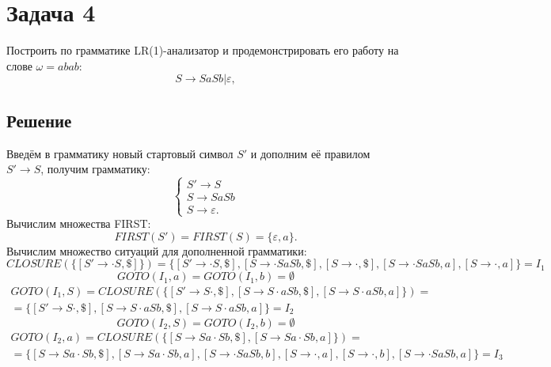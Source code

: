 \documentclass[11pt]{article}
\begin{document}
\section{Задача 4}
\label{sec:org5ca31a9}
Построить по грамматике LR(1)-анализатор и продемонстрировать его работу на слове \(\omega = abab\):
\begin{equation}
S \rightarrow SaSb | \varepsilon,
\end{equation}
\subsection{Решение}
\label{sec:org4dc1cd1}
Введём в грамматику новый стартовый символ \(S'\) и дополним её правилом \(S' \rightarrow S\), получим грамматику:
\begin{equation}
\begin{cases}
S' \rightarrow S \\
S \rightarrow SaSb \\
S \rightarrow \varepsilon.
\end{cases}
\end{equation}
Вычислим множества FIRST:
\begin{equation*}
FIRST(S') = FIRST(S) = \{\varepsilon, a\}.
\end{equation*}
Вычислим множество ситуаций для дополненной грамматики:
\begin{equation*}
CLOSURE(\{[S' \rightarrow \cdot S, \$]\}) = \{[S' \rightarrow \cdot S, \$],
[S \rightarrow \cdot SaSb, \$], [S \rightarrow \cdot, \$],
[S \rightarrow \cdot SaSb, a], [S \rightarrow \cdot, a]\} = I_1
\end{equation*}
\begin{equation*}
GOTO(I_1, a) = GOTO(I_1, b) = \emptyset
\end{equation*}
\begin{multline*}
GOTO(I_1, S) = CLOSURE(\{[S' \rightarrow S\cdot, \$], [S \rightarrow S\cdot aSb, \$],
[S \rightarrow S\cdot aSb, a]\}) = \\
= \{[S' \rightarrow S\cdot, \$], [S \rightarrow S\cdot aSb, \$],
[S \rightarrow S\cdot aSb, a]\} = I_2
\end{multline*}
\begin{equation*}
GOTO(I_2, S) = GOTO(I_2, b) = \emptyset
\end{equation*}
\begin{multline*}
GOTO(I_2, a) = CLOSURE(\{[S \rightarrow Sa\cdot Sb, \$], [S \rightarrow Sa\cdot Sb, a]\}) = \\
= \{[S \rightarrow Sa\cdot Sb, \$], [S \rightarrow Sa\cdot Sb, a],
[S \rightarrow \cdot SaSb, b], [S \rightarrow \cdot, a], [S \rightarrow \cdot, b],
[S \rightarrow \cdot SaSb, a]\} = I_3
\end{multline*}
\end{document}
